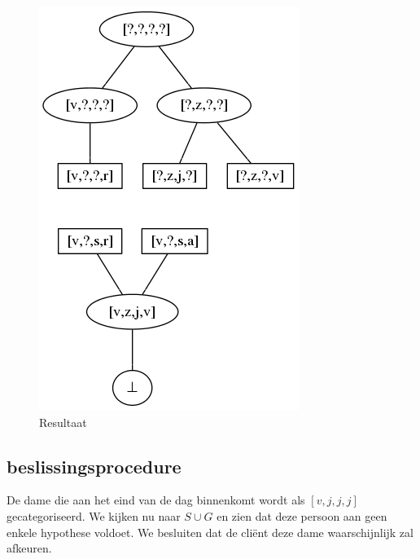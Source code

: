 \documentclass[alternative-exam.tex]{subfiles}
\begin{document}
\begin{figure}
[H]
\centering
\caption{Resultaat}
\label{resultaat}
\includegraphics[scale=0.5]{resources/graphs/resultaat.png}
\end{figure}


\subsection{beslissingsprocedure}
De dame die aan het eind van de dag binnenkomt wordt als $[v,j,j,j]$ gecategoriseerd.
We kijken nu naar $S\cup G$ en zien dat deze persoon aan geen enkele hypothese voldoet. We besluiten dat de cli\"ent deze dame waarschijnlijk zal afkeuren.
\end{document}
